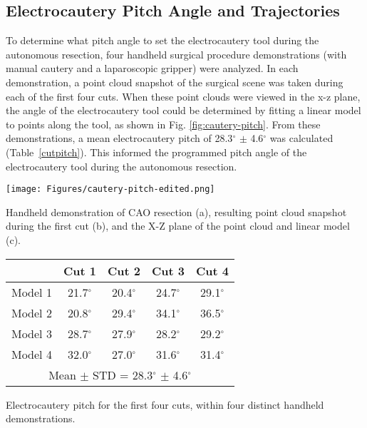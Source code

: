 \subsection{Electrocautery Pitch Angle and Trajectories} 

To determine what pitch angle to set the electrocautery tool during the autonomous resection, four handheld surgical procedure demonstrations (with manual cautery and a laparoscopic gripper) were analyzed. In each demonstration, a point cloud snapshot of the surgical scene was taken during each of the first four cuts. When these point clouds were viewed in the x-z plane, the angle of the electrocautery tool could be determined by fitting a linear model to points along the tool, as shown in Fig. \ref{fig:cautery-pitch}. From these demonstrations, a mean electrocautery pitch of 28.3\(^\circ\) $\pm$ 4.6\(^\circ\) was calculated (Table~\ref{cutpitch}). This informed the programmed pitch angle of the electrocautery tool during the autonomous resection.

\vspace{1em}
\begin{figurehere}
    \centering
    \texttt{[image: Figures/cautery-pitch-edited.png]}
    \caption{Handheld demonstration of CAO resection (a), resulting point cloud snapshot during the first cut (b), and the X-Z plane of the point cloud and linear model (c).}
    \label{fig:cautery-pitch}
\end{figurehere}

\begin{tablehere}
\centering
\begin{tabular}{|c|c|c|c|c|}  \hline
     & Cut 1 & Cut 2 & Cut 3 & Cut 4  \\ \hline
  Model 1 & 21.7\(^\circ\)     & 20.4\(^\circ\)     & 24.7\(^\circ\)     & 29.1\(^\circ\)     \\ \hline
  Model 2 & 20.8\(^\circ\)     & 29.4\(^\circ\)     & 34.1\(^\circ\)     & 36.5\(^\circ\)     \\ \hline
  Model 3 & 28.7\(^\circ\)     & 27.9\(^\circ\)     & 28.2\(^\circ\)     & 29.2\(^\circ\)     \\ \hline
  Model 4 & 32.0\(^\circ\)     & 27.0\(^\circ\)     & 31.6\(^\circ\)     & 31.4\(^\circ\)     \\ \hline
             \multicolumn{5}{|c|}{Mean $\pm$ STD = 28.3\(^\circ\) $\pm$ 4.6\(^\circ\)} \\ \hline
\end{tabular}
\caption{Electrocautery pitch for the first four cuts, within four distinct handheld demonstrations.}
\label{cutpitch}
\end{tablehere}



